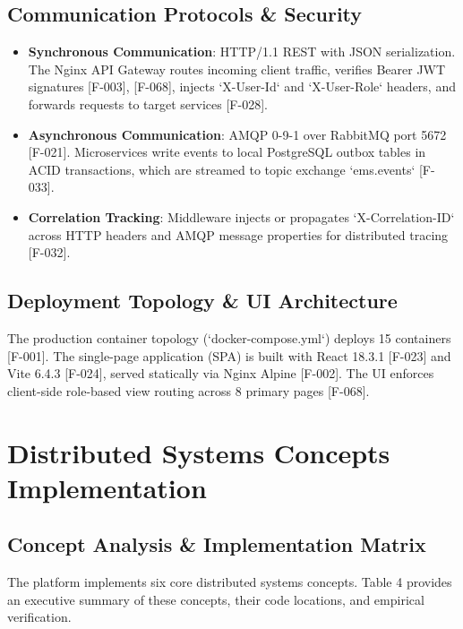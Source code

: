 \documentclass[11pt,a4paper]{article}
\begin{document}
\subsection{Communication Protocols \& Security}
\begin{itemize}
    \item \textbf{Synchronous Communication}: HTTP/1.1 REST with JSON serialization. The Nginx API Gateway routes incoming client traffic, verifies Bearer JWT signatures [F-003], [F-068], injects `X-User-Id` and `X-User-Role` headers, and forwards requests to target services [F-028].
    \item \textbf{Asynchronous Communication}: AMQP 0-9-1 over RabbitMQ port 5672 [F-021]. Microservices write events to local PostgreSQL outbox tables in ACID transactions, which are streamed to topic exchange `ems.events` [F-033].
    \item \textbf{Correlation Tracking}: Middleware injects or propagates `X-Correlation-ID` across HTTP headers and AMQP message properties for distributed tracing [F-032].
\end{itemize}

\subsection{Deployment Topology \& UI Architecture}
The production container topology (`docker-compose.yml`) deploys 15 containers [F-001]. The single-page application (SPA) is built with React 18.3.1 [F-023] and Vite 6.4.3 [F-024], served statically via Nginx Alpine [F-002]. The UI enforces client-side role-based view routing across 8 primary pages [F-068].

\section{Distributed Systems Concepts Implementation}

\subsection{Concept Analysis \& Implementation Matrix}
The platform implements six core distributed systems concepts. Table 4 provides an executive summary of these concepts, their code locations, and empirical verification.
\end{document}
